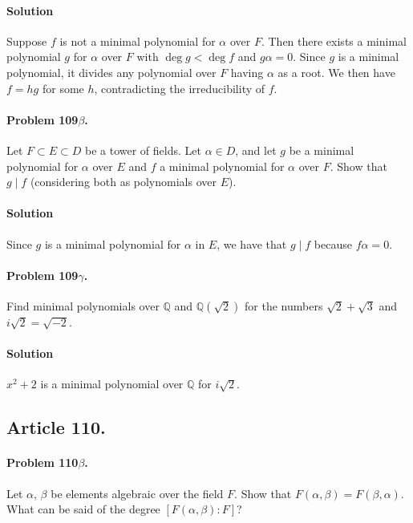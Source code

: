 \paragraph{Solution}
Suppose $f$ is not a minimal polynomial for $\alpha$ over $F$. Then there
exists a minimal polynomial $g$ for $\alpha$ over $F$ with $\deg g < \deg f$
and $g\alpha = 0$. Since $g$ is a minimal polynomial, it divides any polynomial
over $F$ having $\alpha$ as a root. We then have $f = hg$ for some $h$,
contradicting the irreducibility of $f$.

\paragraph{Problem 109$\beta$.}
Let $F \subset E \subset D$ be a tower of fields. Let $\alpha \in D$, and let
$g$ be a minimal polynomial for $\alpha$ over $E$ and $f$ a minimal polynomial
for $\alpha$ over $F$. Show that $g \mid f$ (considering both as polynomials
over $E$).

\paragraph{Solution}
Since $g$ is a minimal polynomial for $\alpha$ in $E$, we
have that $g \mid f$ because $f\alpha = 0$.

\paragraph{Problem 109$\gamma$.}
Find minimal polynomials over $\mathbb{Q}$ and $\mathbb{Q}(\sqrt{2})$ for the
numbers $\sqrt{2} + \sqrt{3}$ and $i\sqrt{2} = \sqrt{-2}$.

\paragraph*{Solution}
$x^2 + 2$ is a minimal polynomial over $\mathbb{Q}$ for $i\sqrt{2}$.

\subsection{Article 110.}

\paragraph{Problem 110$\beta$.}
Let $\alpha$, $\beta$ be elements algebraic over the field $F$. Show that
$F(\alpha, \beta) = F(\beta, \alpha)$. What can be said of the degree
$[F(\alpha, \beta) : F]$?

